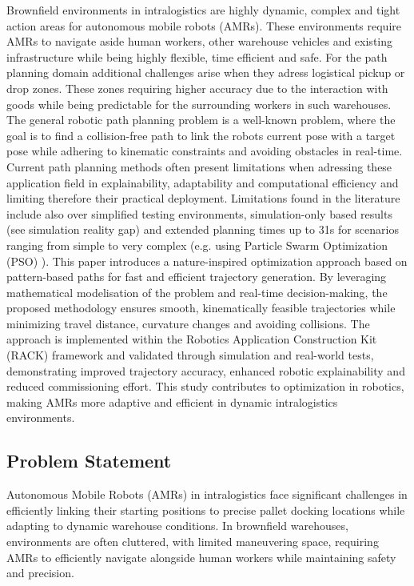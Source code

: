\documentclass{amam}                %
\begin{document}
Brownfield environments in intralogistics are highly dynamic, complex and tight action areas for autonomous mobile robots (AMRs).
These environments require AMRs to navigate aside human workers, other warehouse vehicles and existing infrastructure while being highly 
flexible, time efficient and safe. For the path planning domain additional challenges arise when 
they adress logistical pickup or drop zones. These zones requiring higher accuracy due to the interaction with goods  while being
predictable for the surrounding workers in such warehouses. The general robotic path planning problem is a well-known problem,
where the goal is to find a collision-free path to link the robots current pose with a target pose while adhering to kinematic
constraints and avoiding obstacles in real-time. Current path planning methods often present limitations when adressing these application field in
explainability, adaptability and computational efficiency and limiting therefore their practical deployment. Limitations found in the literature
include also over simplified testing environments, simulation-only based results (see simulation reality gap) and extended planning times up to 31s
for scenarios ranging from simple to very complex (e.g. using Particle Swarm Optimization (PSO) \cite{ref1}). This paper introduces a 
nature-inspired optimization approach based on pattern-based paths for fast and efficient trajectory generation. By leveraging mathematical
modelisation of the problem and real-time decision-making, the proposed  methodology ensures smooth, kinematically feasible trajectories while
minimizing travel distance, curvature changes and avoiding collisions. The approach is implemented within the Robotics Application Construction Kit (RACK) 
framework and validated through simulation and real-world tests, demonstrating improved trajectory accuracy, enhanced robotic explainability and reduced commissioning effort.
This study contributes to optimization in robotics, making AMRs more adaptive and efficient in dynamic intralogistics environments.

\subsection{Problem Statement}
Autonomous Mobile Robots (AMRs) in intralogistics face significant challenges in efficiently linking their starting positions to precise pallet docking locations while adapting to dynamic warehouse conditions. In brownfield warehouses, environments are often cluttered, with limited maneuvering space, requiring AMRs to efficiently navigate alongside human workers while maintaining safety and precision.
\end{document}
